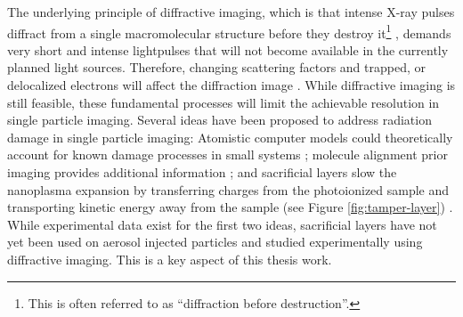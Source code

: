 The underlying principle of diffractive imaging, which is that intense X-ray pulses diffract from a single macromolecular structure before they destroy it\footnote{This is often referred to as ``diffraction before destruction''.} \cite{Neutze-2000-Nature}, demands very short and intense lightpulses \cite{Huldt-2003-JSB,Hau-Riege-2005-PRE} that will not become available in the currently planned light sources. Therefore, changing scattering factors and trapped, or delocalized electrons will affect the diffraction image \cite{Aquila-2015-StrucDyn}. While diffractive imaging is still feasible, these fundamental processes will limit the achievable resolution in single particle imaging. Several ideas have been proposed to address radiation damage in single particle imaging: Atomistic computer models could theoretically account for known damage processes in small systems \citep{Ho-2016-PRA,Quiney-2010-NatPhys}; molecule alignment prior imaging provides additional information \citep{Kupper-2014-PRL}; and sacrificial layers slow the nanoplasma expansion by transferring charges from the photoionized sample and transporting kinetic energy away from the sample (see Figure \ref{fig:tamper-layer}) \citep{Hau-Riege-2004-PRE,Hau-Riege-2010-PRL,Hoener-2008-JPB}. While experimental data exist for the first two ideas, sacrificial layers have not yet been used on aerosol injected particles and studied experimentally using diffractive imaging. This is a key aspect of this thesis work.\\[1\baselineskip]
%
